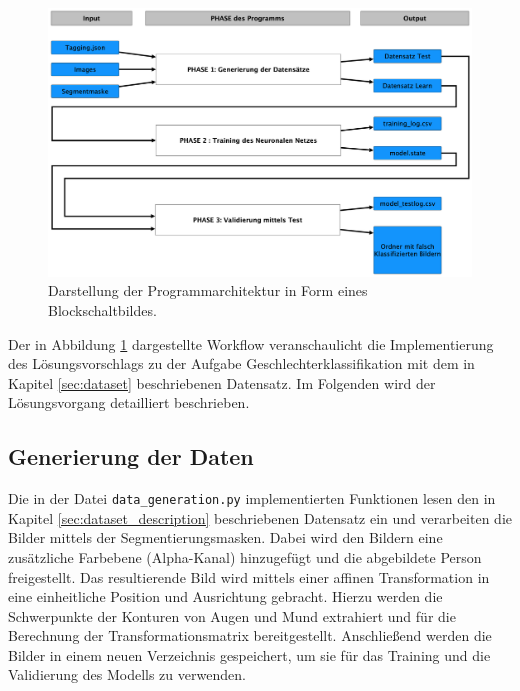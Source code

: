 \documentclass[journal,twoside,web]{ieeecolor}
\begin{document}
\begin{figure}[H]
    \centerline{\includegraphics[width=\columnwidth]{Architektur.png}}
    \caption{Darstellung der Programmarchitektur in Form eines Blockschaltbildes.}
    \label{fig:architecture}
\end{figure}

Der in Abbildung \ref{fig:architecture} dargestellte Workflow veranschaulicht die Implementierung des Lösungsvorschlags zu der Aufgabe Geschlechterklassifikation mit dem in Kapitel \ref{sec:dataset} beschriebenen Datensatz. Im Folgenden wird der Lösungsvorgang detailliert beschrieben.

\subsection{Generierung der Daten}
Die in der Datei \texttt{data\_generation.py} implementierten Funktionen lesen den in Kapitel \ref{sec:dataset_description} beschriebenen Datensatz ein und verarbeiten die Bilder mittels der Segmentierungsmasken. Dabei wird den Bildern eine zusätzliche Farbebene (Alpha-Kanal) hinzugefügt und die abgebildete Person freigestellt. Das resultierende Bild wird mittels einer affinen Transformation in eine einheitliche Position und Ausrichtung gebracht. Hierzu werden die Schwerpunkte der Konturen von Augen und Mund extrahiert und für die Berechnung der Transformationsmatrix bereitgestellt. Anschließend werden die Bilder in einem neuen Verzeichnis gespeichert, um sie für das Training und die Validierung des Modells zu verwenden.
\end{document}
